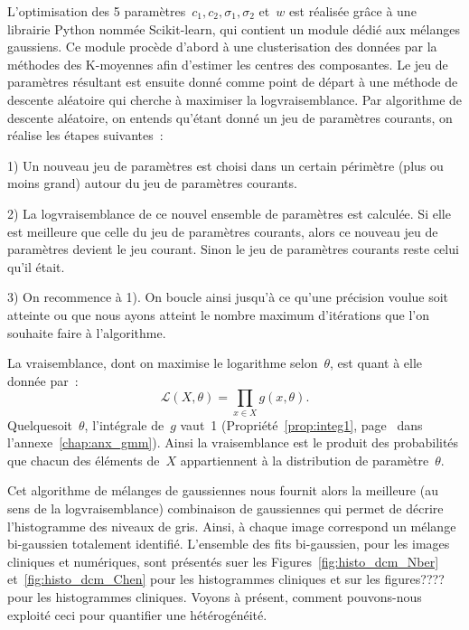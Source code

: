 \documentclass[main.tex]{subfiles}
\begin{document}
L'optimisation des 5 paramètres~$c_1,c_2,\sigma_1,\sigma_2$ et~$w$ est réalisée grâce à une librairie Python nommée Scikit-learn, qui contient un module dédié aux mélanges gaussiens. Ce module procède d'abord à une clusterisation des données par la méthodes des K-moyennes afin d'estimer les centres des composantes. Le jeu de paramètres résultant est ensuite donné comme point de départ à une méthode de descente aléatoire qui cherche à maximiser la logvraisemblance. Par algorithme de descente aléatoire, on entends qu'étant donné un jeu de paramètres courants, on réalise les étapes suivantes~:
\begin{myitemize}
\item[1)] Un nouveau jeu de paramètres est choisi dans un certain périmètre (plus ou moins grand) autour du jeu de paramètres courants.
\item[2)] La logvraisemblance de ce nouvel ensemble de paramètres est calculée. Si elle est meilleure que celle du jeu de paramètres courants, alors ce nouveau jeu de paramètres devient le jeu courant. Sinon le jeu de paramètres courants reste celui qu'il était.
\item[3)] On recommence à 1). On boucle ainsi jusqu'à ce qu'une précision voulue soit atteinte ou que nous ayons atteint le nombre maximum d'itérations que l'on souhaite faire à l'algorithme.
\end{myitemize}
La vraisemblance, dont on maximise le logarithme selon~$\theta$, est quant à elle donnée par~:
\begin{equation}
\mathcal{L}(X,\theta) = \prod_{x \in X} g(x,\theta).
\end{equation}
Quelquesoit~$\theta$, l'intégrale de~$g$ vaut~1 (\cf Propriété~\ref{prop:integ1}, page~\pageref{prop:integ1} dans l'annexe~\ref{chap:anx_gmm}). 
Ainsi la vraisemblance est le produit des probabilités que chacun des éléments de~$X$ appartiennent à la distribution de paramètre~$\theta$.


Cet algorithme de mélanges de gaussiennes nous fournit alors la meilleure  (au sens de la logvraisemblance) combinaison de gaussiennes qui permet de décrire l'histogramme des niveaux de gris. Ainsi, à chaque image correspond un mélange bi-gaussien totalement identifié. L'ensemble des fits 
bi-gaussien, pour les images cliniques et numériques, sont présentés suer les Figures~\ref{fig:histo_dcm_Nber} et~\ref{fig:histo_dcm_Chen} pour les histogrammes cliniques et sur les figures???? pour les histogrammes cliniques. Voyons à présent, comment pouvons-nous exploité ceci pour quantifier une hétérogénéité.
\end{document}
